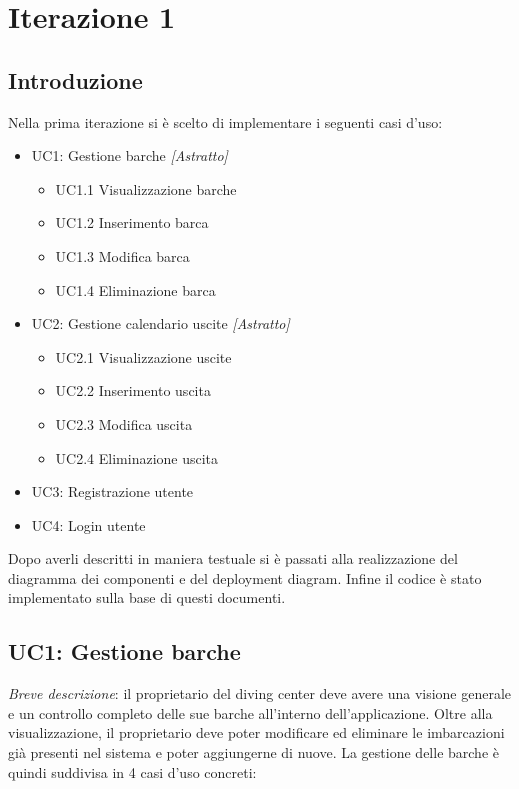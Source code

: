 \chapter{Iterazione 1}

\section{Introduzione}
Nella prima iterazione si è scelto di implementare i seguenti casi d'uso:

\begin{itemize}
    \item UC1: Gestione barche \textit{[Astratto]}
          \begin{itemize}
              \item UC1.1 Visualizzazione barche
              \item UC1.2 Inserimento barca
              \item UC1.3 Modifica barca
              \item UC1.4 Eliminazione barca
          \end{itemize}
    \item UC2: Gestione calendario uscite \textit{[Astratto]}
          \begin{itemize}
              \item UC2.1 Visualizzazione uscite
              \item UC2.2 Inserimento uscita
              \item UC2.3 Modifica uscita
              \item UC2.4 Eliminazione uscita
          \end{itemize}
    \item UC3: Registrazione utente
    \item UC4: Login utente
\end{itemize}
Dopo averli descritti in maniera testuale si è passati alla realizzazione del diagramma dei componenti e del deployment diagram.
Infine il codice è stato implementato sulla base di questi documenti.

\section{UC1: Gestione barche}

\emph{Breve descrizione}: il proprietario del diving center deve avere una visione generale e un controllo completo delle sue barche all'interno dell'applicazione.
Oltre alla visualizzazione, il proprietario deve poter modificare ed eliminare le imbarcazioni già presenti nel sistema e poter aggiungerne di nuove.
La gestione delle barche è quindi suddivisa in 4 casi d'uso concreti:

